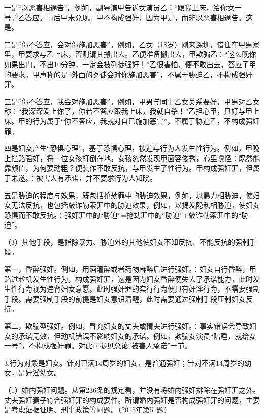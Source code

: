 一是“以恶害相通告”。例如，副导演甲告诉女演员乙：“跟我上床，给你女一号。”乙答应。事后甲未兑现。甲不构成强奸，因为甲是，而非以恶害相通告。这是。

二是“你不答应，会对你施加恶害”。例如，乙女（18岁）刚来深圳，借住在甲男家里，甲要求与乙上床，否则请其搬出去。乙便准备搬出去，甲欺骗乙：“这么晚你如果出门，不出10分钟，一定会被列徒强奸！”乙很害怕，便不敢出去，答应了甲的要求。甲声称的是“外面的歹徒会对你施加恶害”，不属于胁迫乙，不构成强奸罪。

三是“你不答应，我会对施加恶害”。例如，甲男与同事乙女关系要好，甲男对乙女称：“我深深爱上你了，你若不答应跟我上床，我就自杀！”乙担心甲，只好与甲上床。甲的行为属于“你不答应，我就对自已施加恶害”，不属于胁迫乙，不构成强奸罪。

四是妇女产生“恐惧心理”，基于恐惧心理，被迫与行为人发生性行为。例如，甲晚上拦路强奸，将一位女孩打倒在地，女孩忽然发现甲面容俊秀，心里嗔怪：既然能靠颜值，为何要动粗？便装作不敢反抗，与甲发生了性行为。甲构成强奸罪，但属于未遂。：被害人有承诺，并不要求行为人知晓。

五是胁迫的程度与效果，既包括抢劫罪中的胁迫效果，例如，以暴力相胁迫，使妇女无法反抗，也包括敲诈勒索罪中的胁迫效果，例如，以揭发隐私相胁迫，使妇女恐惧而不敢反抗。：强奸罪中的“胁迫”=抢劫罪中的“胁迫”+敲诈勒索罪中的“胁迫”。

（3）其他手段，是指除暴力、胁迫外的其他使妇女不知反抗、不能反抗的强制手段。

第一，昏醉强奸。例如，用酒灌醉或者药物麻醉后进行强奸。：妇女自行昏醉，甲路过趁机发生性行为，构成强奸罪，这是因为妇女昏醉便失去了承诺能力，此时发生性行为视为违背妇女意愿。此时强奸罪的实行行为便只有奸淫行为，不需要强制手段。需要强制手段的前提是妇女意识清醒，此时需要通过强制手段压制妇女反抗。

第二，欺骗型强奸。例如，冒充妇女的丈夫或情夫进行强奸。：事实错误会导致妇女的承诺无效，但动机错误不影响妇女的承诺。例如，欺骗女演员“陪睡，就给女一号”，不构成强奸罪。对此可参见总论“被害人承诺”一节。

3.行为对象是妇女。针对已满14周岁的妇女，是普通强奸；针对不满14周岁的幼女，是奸淫幼女。

（1）婚内强奸问题。从第236条的规定看，并没有将婚内强奸排除在强奸罪之外。丈夫强奸妻子符合强奸罪的构成要件。所谓婚内强奸是否构成强奸罪的问题，主要是考虑证据证明、刑事政策等问题。（2015年第51题）

